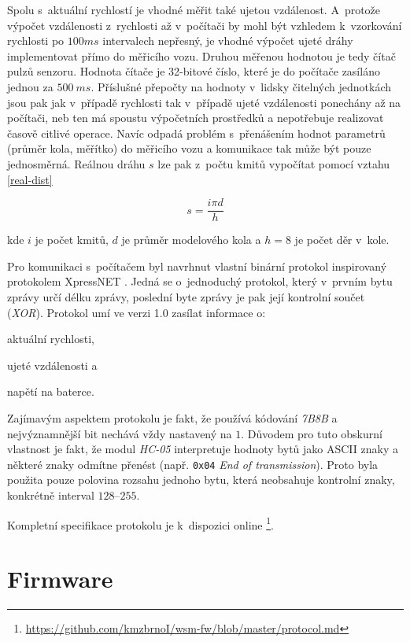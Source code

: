 Spolu s~aktuální rychlostí je vhodné měřit také ujetou vzdálenost. A~protože
výpočet vzdálenosti z~rychlosti až v~počítači by mohl být vzhledem k~vzorkování
rychlosti po $100 ms$ intervalech nepřesný, je vhodné výpočet ujeté dráhy
implementovat přímo do měřicího vozu. Druhou měřenou hodnotou je tedy čítač
pulzů senzoru. Hodnota čítače je 32-bitové číslo, které je do počítače zasíláno
jednou za $500\ ms$. Příslušné přepočty na hodnoty v~lidsky čitelných
jednotkách jsou pak jak v~případě rychlosti tak v~případě ujeté vzdálenosti
ponechány až na počítači, neb ten má spoustu výpočetních prostředků a
nepotřebuje realizovat časově citlivé operace. Navíc odpadá problém
s~přenášením hodnot parametrů (průměr kola, měřítko) do měřicího vozu a
komunikace tak může být pouze jednosměrná. Reálnou dráhu $s$ lze pak z~počtu
kmitů vypočítat pomocí vztahu \ref{real-dist}

\begin{equation}
s = \frac{i \pi d}{h}
\label{real-dist}
\end{equation}

kde $i$ je počet kmitů, $d$ je průměr modelového kola a $h = 8$ je počet děr
v~kole.

Pro komunikaci s~počítačem byl navrhnut vlastní binární protokol inspirovaný
protokolem XpressNET \cite{xpressnet-specs}. Jedná se o~jednoduchý protokol, který
v~prvním bytu zprávy určí délku zprávy, poslední byte zprávy je pak její
kontrolní součet (\textit{XOR}). Protokol umí ve verzi 1.0 zasílat informace o:

\begin{compactenum}
\item aktuální rychlosti,
\item ujeté vzdálenosti a
\item napětí na baterce.
\end{compactenum}

Zajímavým aspektem protokolu je fakt, že používá kódování \textit{7B8B} a
nejvýznamnější bit nechává vždy nastavený na $1$. Důvodem pro tuto obskurní
vlastnost je fakt, že modul \textit{HC-05} interpretuje hodnoty bytů jako
ASCII znaky a některé znaky odmítne přenést (např. \texttt{0x04} \textit{End
of transmission}). Proto byla použita pouze polovina rozsahu jednoho
bytu, která neobsahuje kontrolní znaky, konkrétně interval $128$--$255$.

Kompletní specifikace protokolu je k~dispozici online
\footnote{\url{https://github.com/kmzbrnoI/wsm-fw/blob/master/protocol.md}}.

\section{Firmware}
\label{sec:wsm-fw}

